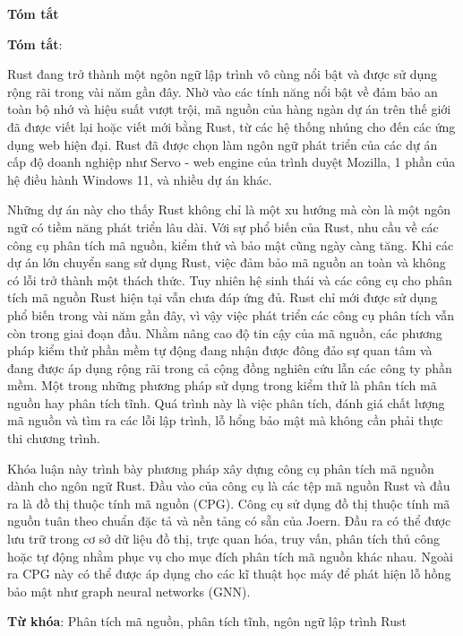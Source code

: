 \begin{center}
\textbf{\large{Tóm tắt}	}
\end{center}


\begin{small}
\textbf{Tóm tắt}:

Rust đang trở thành một ngôn ngữ lập trình vô cùng nổi bật và được sử dụng rộng rãi trong vài năm gần đây.
Nhờ vào các tính năng nổi bật về đảm bảo an toàn bộ nhớ và hiệu suất vượt trội, mã nguồn của hàng ngàn dự án trên thế giới đã được viết lại hoặc viết mới bằng Rust, từ các hệ thống nhúng cho đến các ứng dụng web hiện đại.
Rust đã được chọn làm ngôn ngữ phát triển của các dự án cấp độ doanh nghiệp như Servo - web engine của trình duyệt Mozilla, 1 phần của hệ điều hành Windows 11, và nhiều dự án khác.

Những dự án này cho thấy Rust không chỉ là một xu hướng mà còn là một ngôn ngữ có tiềm năng phát triển lâu dài.
Với sự phổ biến của Rust, nhu cầu về các công cụ phân tích mã nguồn, kiểm thử và bảo mật cũng ngày càng tăng.
Khi các dự án lớn chuyển sang sử dụng Rust, việc đảm bảo mã nguồn an toàn và không có lỗi trở thành một thách thức.
Tuy nhiên hệ sinh thái và các công cụ cho phân tích mã nguồn Rust hiện tại vẫn chưa đáp ứng đủ.
Rust chỉ mới được sử dụng phổ biến trong vài năm gần đây, vì vậy việc phát triển các công cụ phân tích vẫn còn trong giai đoạn đầu.
Nhằm nâng cao độ tin cậy của mã nguồn, các phương pháp kiểm thử phần mềm tự động đang nhận được đông đảo sự quan tâm và đang được áp dụng rộng rãi trong cả cộng đồng nghiên cứu lẫn các công ty phần mềm.
Một trong những phương pháp sử dụng trong kiểm thử là phân tích mã nguồn hay phân tích tĩnh.
Quá trình này là việc phân tích, đánh giá chất lượng mã nguồn và tìm ra các lỗi lập trình, lỗ hổng bảo mật mà không cần phải thực thi chương trình.

Khóa luận này trình bày phương pháp xây dựng công cụ phân tích mã nguồn dành cho ngôn ngữ Rust.
Đầu vào của công cụ là các tệp mã nguồn Rust và đầu ra là đồ thị thuộc tính mã nguồn (CPG).
Công cụ sử dụng đồ thị thuộc tính mã nguồn tuân theo chuẩn đặc tả và nền tảng có sẵn của Joern.
Đầu ra có thể được lưu trữ trong cơ sở dữ liệu đồ thị, trực quan hóa, truy vấn, phân tích thủ công hoặc tự động nhằm phục vụ cho mục đích phân tích mã nguồn khác nhau.
Ngoài ra CPG này có thể được áp dụng cho các kĩ thuật học máy để phát hiện lỗ hồng bảo mật như graph neural networks (GNN).

\vspace*{1cm}
\textbf{Từ khóa}: Phân tích mã nguồn, phân tích tĩnh, ngôn ngữ lập trình Rust

\end{small}